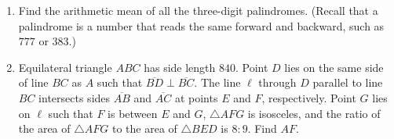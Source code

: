 \documentclass{article}
\begin{document}
\begin{enumerate}[label=\arabic*., itemsep=0.5em]\item Find the arithmetic mean of all the three-digit palindromes. (Recall that a palindrome is a number that reads the same forward and backward, such as \(777\) or \(383\).)\par \vspace{0.5em}\item Equilateral triangle \(ABC\) has side length \(840\). Point \(D\) lies on the same side of line \(BC\) as \(A\) such that \(\overline{BD} \perp \overline{BC}\). The line \(\ell\) through \(D\) parallel to line \(BC\) intersects sides \(\overline{AB}\) and \(\overline{AC}\) at points \(E\) and \(F\), respectively. Point \(G\) lies on \(\ell\) such that \(F\) is between \(E\) and \(G\), \(\triangle AFG\) is isosceles, and the ratio of the area of \(\triangle AFG\) to the area of \(\triangle BED\) is \(8:9\). Find \(AF\).


\end{enumerate}
\end{document}
